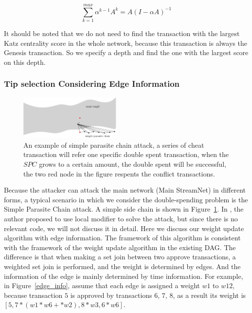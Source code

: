 \begin{equation}
\label{simple_equation}
\sum_{k=1}^{max} \alpha^{k-1}A^{k}=A(I-\alpha A)^{-1}
\end{equation}

It should be noted that we do not need to find the transaction with the largest Katz centrality score in the whole network,
because this transaction is always the Genesis transaction.
So we specify a depth and find the one with the largest score on this depth. 

\subsubsection{Tip selection Considering Edge Information}

\begin{figure}[!ht]
\begin{center}
\includegraphics[width=0.45\textwidth]{figures/spc.png}
    \caption{
        An example of simple parasite chain attack, a series of cheat transaction will refer one specific double spent transaction, 
        when the $SPC$ grows to a certain amount, the double spent will be successful, the two red node in the figure respents the 
        conflict transactions.
     }
\label{spc}
\end{center}
\end{figure}

Because the attacker can attack the main network (Main StreamNet) in different forms,
a typical scenario in which we consider the double-spending problem is the Simple Parasite Chain attack.
A simple side chain is shown in Figure~\ref{spc}. 
In \cite{iota_proof}, the author proposed to use local modifier to solve the attack, but since there is no relevant code, we will not discuss it in detail. 
Here we discuss our weight update algorithm with edge information.
The framework of this algorithm is consistent with the framework of the weight update algorithm in the existing DAG.
The difference is that when making a set join between two approve transactions, a weighted set join is performed, and the weight is determined by edges. 
And the information of the edge is mainly determined by time information. 
For example, in Figure~\ref{edge_info}, assume that each edge is assigned a weight $w1$ to $w12$, 
because transaction $5$ is approved by transactions $6$, $7$, $8$, as a result its weight is $[5,7*(w1*w6+*w2) , 8*w3, 6*w6]$.

